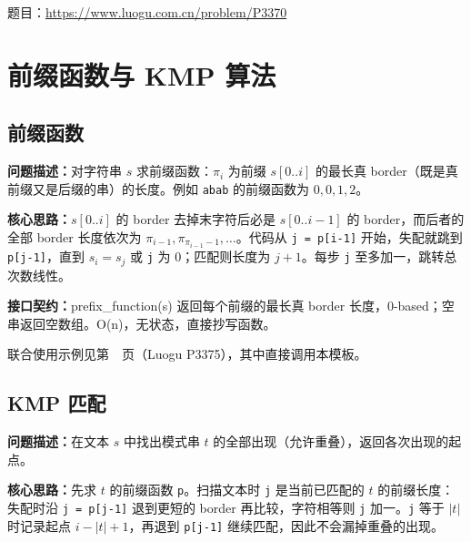 题目：\url{https://www.luogu.com.cn/problem/P3370}



\Needspace{349pt}

\chapter{前缀函数与 KMP 算法}

\section{前缀函数}\label{compact-prefix_function}

\noindent\textbf{问题描述：}\allowbreak 对字符串 $s$ 求前缀函数：$\pi_i$ 为前缀 $s[0..i]$ 的最长真 border（既是真前缀又是后缀的串）的长度。例如 \texttt{abab} 的前缀函数为 $0,0,1,2$。

\textbf{核心思路：}\allowbreak $s[0..i]$ 的 border 去掉末字符后必是 $s[0..i-1]$ 的 border，而后者的全部 border 长度依次为 $\pi_{i-1},\pi_{\pi_{i-1}-1},\dots$。代码从 \texttt{j = p[i-1]} 开始，失配就跳到 \texttt{p[j-1]}，直到 $s_i=s_j$ 或 \texttt{j} 为 0；匹配则长度为 $j+1$。每步 \texttt{j} 至多加一，跳转总次数线性。



{\sloppy{}\noindent\textbf{接口契约：}prefix\_function(s) 返回每个前缀的最长真 border 长度，0-based；空串返回空数组。O(n)，无状态，直接抄写函数。\par}



联合使用示例见第~\pageref{usage-example-91}~页（Luogu P3375），其中直接调用本模板。

\Needspace{345pt}

\section{KMP 匹配}\label{compact-kmp_match}

\noindent\textbf{问题描述：}\allowbreak 在文本 $s$ 中找出模式串 $t$ 的全部出现（允许重叠），返回各次出现的起点。

\textbf{核心思路：}\allowbreak 先求 $t$ 的前缀函数 \texttt{p}。扫描文本时 \texttt{j} 是当前已匹配的 $t$ 的前缀长度：失配时沿 \texttt{j = p[j-1]} 退到更短的 border 再比较，字符相等则 \texttt{j} 加一。\texttt{j} 等于 $|t|$ 时记录起点 $i-|t|+1$，再退到 \texttt{p[j-1]} 继续匹配，因此不会漏掉重叠的出现。

